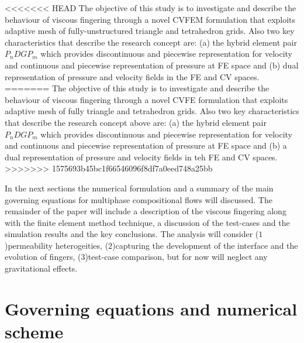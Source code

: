 \documentclass[preprint,authoryear,12pt]{elsarticle}
\begin{document}
\medskip
<<<<<<< HEAD
The objective of this study is to investigate and describe the behaviour of viscous fingering through a novel CVFEM formulation that exploits adaptive mesh of fully-unstructured triangle and tetrahedron grids. Also two key characteristics that describe the research concept are: (a) the hybrid element pair $P_{n}DGP_{m}$ which provides discontinuous and piecewise representation for velocity and continuous and piecewise representation of pressure at FE space and (b) dual representation of pressure and velocity fields in the FE and CV spaces.
=======
The objective of this study is to investigate and describe the behaviour of viscous fingering through a novel CVFE formulation that exploits adaptive mesh of fully triangle and tetrahedron grids. Also two key characteristics that describe the research concept above are: (a) the hybrid element pair $P_{n}DGP_{m}$ which provides discontinuous and piecewise representation for velocity and continuous and piecewise representation of pressure at FE space and (b) a dual representation of pressure and velocity fields in teh FE and CV spaces.
>>>>>>> 1575693b45bc1f66546096f8df7a0eed748a25bb

\medskip
In the next sections the numerical formulation and a summary of the main governing equations for multiphase compositional flows will discussed. The remainder of the paper will include a description of the viscous fingering along with the finite element method technique, a discussion of the test-cases and the simulation results and the key conclusions. The analysis will consider ($1$)permeability heterogeities, ($2$)capturing the development of the interface and the evolution of fingers, ($3$)test-case comparison, but for now will neglect any gravitational effects.


\section{Governing equations and numerical scheme}\label{equations_scheme}      
\end{document}
